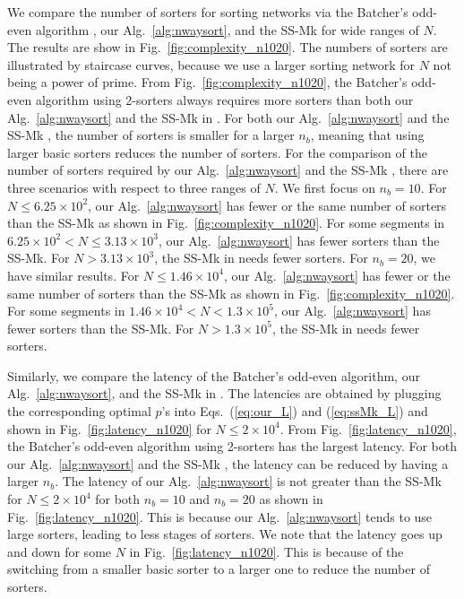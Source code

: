 \documentclass[10pt,journal,cspaper,compsoc]{IEEEtran}
\begin{document}
We compare the number of sorters for sorting networks via the Batcher's odd-even algorithm \cite{Bat68sorting}, our Alg.~\ref{alg:nwaysort}, and the SS-Mk \cite{gao1997sloping} for wide ranges of $N$. The results are show in Fig.~\ref{fig:complexity_n1020}. The numbers of sorters are illustrated by staircase curves, because we use a larger sorting network for $N$ not being a power of prime.
From Fig.~\ref{fig:complexity_n1020}, the Batcher's odd-even algorithm using 2-sorters always requires more sorters than both our Alg.~\ref{alg:nwaysort} and the SS-Mk in \cite{gao1997sloping}.
For both our Alg.~\ref{alg:nwaysort} and the SS-Mk \cite{gao1997sloping}, the number of sorters is smaller for a larger $n_b$, meaning that using larger basic sorters reduces the number of sorters.
For the comparison of the number of sorters required by our Alg.~\ref{alg:nwaysort} and the SS-Mk \cite{gao1997sloping}, there are three scenarios with respect to three ranges of $N$. We first focus on $n_b = 10$. For $N \le 6.25 \times 10^2$, our Alg.~\ref{alg:nwaysort} has fewer or the same number of sorters than the SS-Mk as shown in Fig.~\ref{fig:complexity_n1020}. For some segments in $6.25 \times 10^2 < N \le 3.13 \times 10^3$, our Alg.~\ref{alg:nwaysort} has fewer sorters than the SS-Mk.
For $N > 3.13 \times 10^3$, the SS-Mk in \cite{gao1997sloping} needs fewer sorters.
For $n_b = 20$, we have similar results.
For $N \le 1.46 \times 10^4$, our Alg.~\ref{alg:nwaysort} has fewer or the same number of sorters than the SS-Mk as shown in Fig.~\ref{fig:complexity_n1020}. For some segments in $1.46 \times 10^4 < N < 1.3 \times 10^5$, our Alg.~\ref{alg:nwaysort} has fewer sorters than the SS-Mk. For $N > 1.3 \times 10^5$, the SS-Mk in \cite{gao1997sloping} needs fewer sorters.


Similarly, we compare the latency of the Batcher's odd-even algorithm, our Alg.~\ref{alg:nwaysort}, and the SS-Mk in \cite{gao1997sloping}. The latencies are obtained by plugging the corresponding optimal $p$'s into Eqs.~(\ref{eq:our_L}) and (\ref{eq:ssMk_L}) and shown in Fig.~\ref{fig:latency_n1020} for $N \le 2 \times 10^4$.
From Fig.~\ref{fig:latency_n1020}, the Batcher's odd-even algorithm using 2-sorters has the largest latency. For both our Alg.~\ref{alg:nwaysort} and the SS-Mk \cite{gao1997sloping}, the latency can be reduced by having a larger $n_b$.
The latency of our Alg.~\ref{alg:nwaysort} is not greater than the SS-Mk for $N \le 2 \times 10^4$ for both $n_b = 10$ and $n_b = 20$ as shown in Fig.~\ref{fig:latency_n1020}. This is because our Alg.~\ref{alg:nwaysort} tends to use large sorters, leading to less stages of sorters. We note that the latency goes up and down for some $N$ in Fig.~\ref{fig:latency_n1020}. This is because of the switching from a smaller basic sorter to a larger one to reduce the number of sorters.
\end{document}
